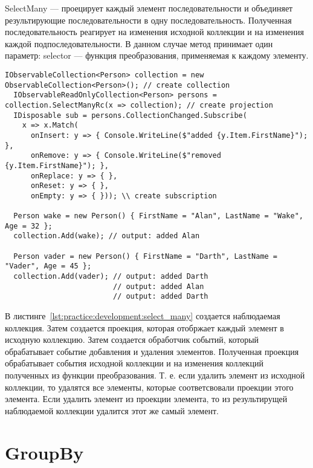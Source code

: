 SelectMany --- проецирует каждый элемент последовательности и объединяет результирующие последовательности в одну последовательность. Полученная последовательность реагирует на изменения исходной коллекции и на изменения каждой подпоследовательности.
В данном случае метод принимает один параметр: selector --- функция преобразования, применяемая к каждому элементу.

\begin{lstlisting}[style=csharpinlinestyle, caption={Пример использования SelectMany}, label=lst:practice:development:select_many]
  IObservableCollection<Person> collection = new ObservableCollection<Person>(); // create collection
  IObservableReadOnlyCollection<Person> persons = collection.SelectManyRc(x => collection); // create projection
  IDisposable sub = persons.CollectionChanged.Subscribe(
    x => x.Match(
      onInsert: y => { Console.WriteLine($"added {y.Item.FirstName}"); },
      onRemove: y => { Console.WriteLine($"removed {y.Item.FirstName}"); },
      onReplace: y => { },
      onReset: y => { },
      onEmpty: y => { })); \\ create subscription

  Person wake = new Person() { FirstName = "Alan", LastName = "Wake", Age = 32 };
  collection.Add(wake); // output: added Alan

  Person vader = new Person() { FirstName = "Darth", LastName = "Vader", Age = 45 };
  collection.Add(vader); // output: added Darth
                         // output: added Alan
                         // output: added Darth
\end{lstlisting}

В листинге~\ref{lst:practice:development:select_many} создается наблюдаемая коллекция. Затем создается проекция, которая отобржает каждый элемент в исходную коллекцию.
Затем создается обработчик событий, который обрабатывает событие добавления и удаления элементов.
Полученная проекция обрабатывает события исходной коллекции и на изменения коллекций полученных из функции преобразования.
Т. е. если удалить элемент из исходной коллекции, то удалятся все элементы, которые соответсвовали проекции этого элемента.
Если удалить элемент из проекции элемента, то из результирущей наблюдаемой коллекции удалится этот же самый элемент.

\section{GroupBy}
\label{sub:development:group_by}

